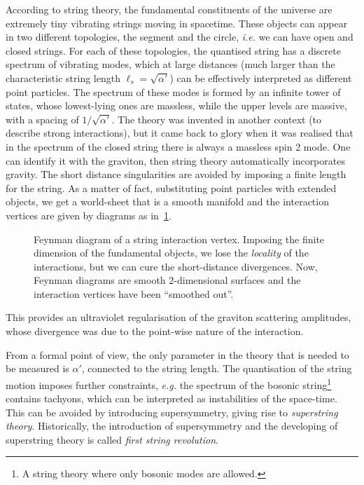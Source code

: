\documentclass[draft]{phd}
\begin{document}
		According to string theory, the fundamental constituents of the universe are extremely tiny vibrating strings moving in spacetime.
		These objects can appear in two different topologies, the segment and the circle, \emph{i.e.} we can have open and closed strings.
		For each of these topologies, the quantised string has a discrete spectrum of vibrating modes, which at large distances (much larger than the characteristic string length $\ell_s = \sqrt{\alpha'}$) can be effectively
interpreted as different point particles.
		The spectrum of these modes is formed by an infinite tower of states, whose lowest-lying ones are massless, while the upper levels are massive, with a spacing of $1/\sqrt{\alpha'}$.
		The theory was invented in another context (to describe strong interactions), but it came back to glory when it was realised that in the spectrum of the closed string there is always a massless spin 2 mode.
		One can identify it with the graviton, then string theory automatically incorporates gravity.
		The short distance singularities are avoided by imposing a finite length for the string.
		As a matter of fact, substituting point particles with extended objects, we get a world-sheet that is a smooth manifold and the interaction vertices are given by diagrams as in~\cref{stringdiagram}.
				\begin{figure}[ht]
					\centering
						\scalebox{1.3}{}
					\caption{Feynman diagram of a string interaction vertex. 
						Imposing the finite dimension of the fundamental objects, we lose the \emph{locality} of the interactions, but we can cure the short-distance divergences.
						Now, Feynman diagrams are smooth $2$-dimensional surfaces and the interaction vertices have been ``smoothed out''.
					 }
					\label{stringdiagram}
				\end{figure}
		This provides an ultraviolet regularisation of the graviton scattering amplitudes, whose divergence was due to the point-wise nature of the interaction.
		
		From a formal point of view, the only parameter in the theory that is needed to be measured is $\alpha'$, connected to the string length.
		The quantisation of the string motion imposes further constraints, \emph{e.g.} the spectrum of the bosonic string\footnote{%
			A string theory where only bosonic modes are allowed.}
		contains tachyons, which can be interpreted as instabilities of the space-time.
		This can be avoided by introducing supersymmetry, giving rise to \emph{superstring theory}.
		Historically, the introduction of supersymmetry and the developing of superstring theory is called \emph{first string revolution}.
		
\end{document}
